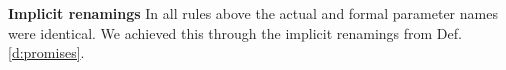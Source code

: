 \vspace{.1cm}
 {{
\noindent
\textbf{Implicit renamings} In all rules above  the actual and formal parameter names were identical. We achieved this through the implicit renamings from Def. \ref{d:promises}.  
 }}
 


%
%
%





